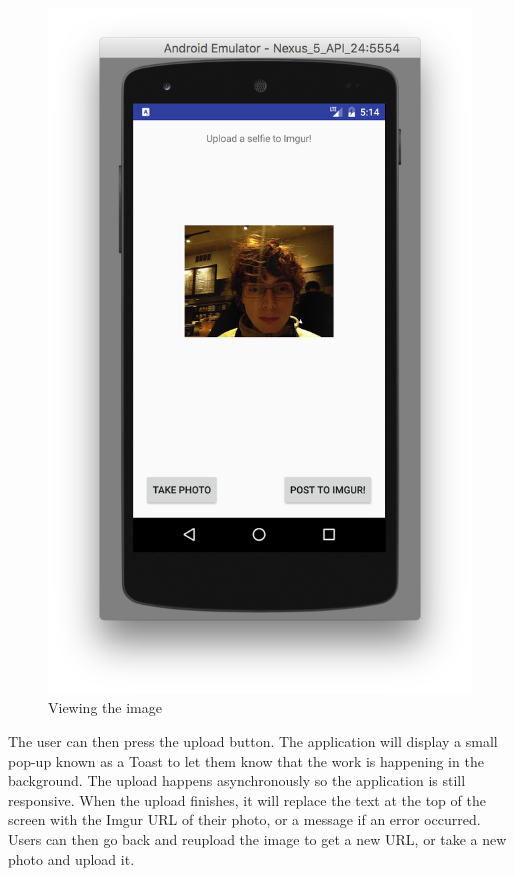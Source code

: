 \documentclass[12pt]{article}
\begin{document}
\begin{figure}[H]
    \includegraphics[scale=0.5]{./step3.png}
    \caption{Viewing the image}
\end{figure}


The user can then press the upload button. The application will display a small pop-up known as a Toast to let them know that the work is happening in the background. The upload happens asynchronously so the application is still responsive. When the upload finishes, it will replace the text at the top of the screen with the Imgur URL of their photo, or a message if an error occurred. Users can then go back and reupload the image to get a new URL, or take a new photo and upload it.
\end{document}
